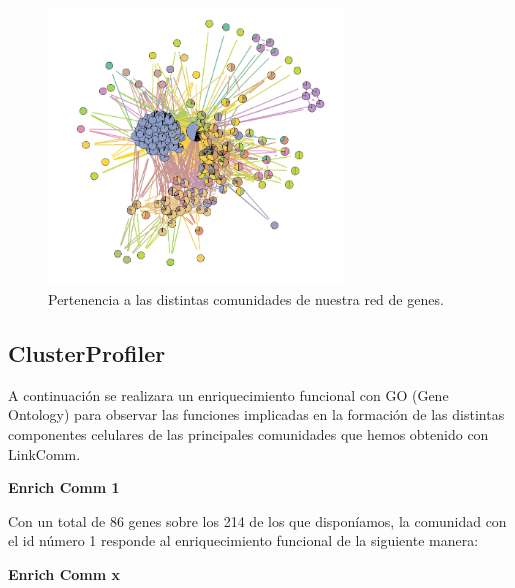 \begin{figure}[h]
	\centering
	\includegraphics[width=0.70\textwidth]{figures/Grafo_Linkcomm.PNG}
	\caption{Pertenencia a las distintas comunidades de nuestra red de genes. }
	\label{fig:LinkComm3}
\end{figure}

\subsection{ClusterProfiler}

A continuación se realizara un enriquecimiento funcional con GO (Gene Ontology) para observar las funciones implicadas en la formación de las distintas componentes celulares de las principales comunidades que hemos obtenido con LinkComm.

\hfill

\textbf{Enrich Comm 1}

Con un total de 86 genes sobre los 214 de los que disponíamos, la comunidad con el id número 1 responde al enriquecimiento funcional de la siguiente manera:




\hfill

\textbf{Enrich Comm x}




\hfill
